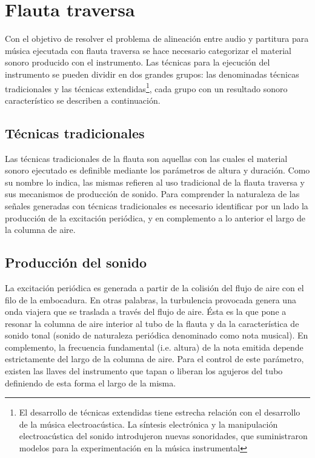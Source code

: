 \documentclass
  [ams,pdfout]%
	{aeslac}
\begin{document}
%
\section{Flauta traversa}

Con el objetivo de resolver el problema de alineación entre audio y partitura para música ejecutada con flauta traversa se hace necesario categorizar el material sonoro producido con el instrumento. Las técnicas para la ejecución del instrumento se pueden dividir en dos grandes grupos: las denominadas técnicas tradicionales y las técnicas extendidas\footnote{El desarrollo de técnicas extendidas tiene estrecha relación con el desarrollo de la música electroacústica. La síntesis electrónica y la manipulación electroacústica del sonido introdujeron nuevas sonoridades, que suministraron modelos para la experimentación en la música instrumental}, cada grupo con un resultado sonoro característico se describen a continuación.

%
\subsection{Técnicas tradicionales}

Las técnicas tradicionales de la flauta son aquellas con las cuales el material sonoro ejecutado es definible mediante los parámetros de altura y duración. Como su nombre lo indica, las mismas refieren al uso tradicional de la flauta traversa y sus mecanismos de producción de sonido. Para comprender la naturaleza de las señales generadas con técnicas tradicionales es necesario identificar por un lado la producción de la excitación periódica, y en complemento a lo anterior el largo de la columna de aire. 

%
\subsection*{Producción del sonido}

La excitación periódica es generada a partir de la colisión del flujo de aire con el filo de la embocadura. En otras palabras, la turbulencia provocada genera una onda viajera que se traslada a través del flujo de aire. Ésta es la que pone a resonar la columna de aire interior al tubo de la flauta y da la característica de sonido tonal (sonido de naturaleza periódica denominado como nota musical). En complemento, la frecuencia fundamental (i.e. altura) de la nota emitida depende estrictamente del largo de la columna de aire. Para el control de este parámetro, existen las llaves del instrumento que tapan o liberan los agujeros del tubo definiendo de esta forma el largo de la misma.
\end{document}
